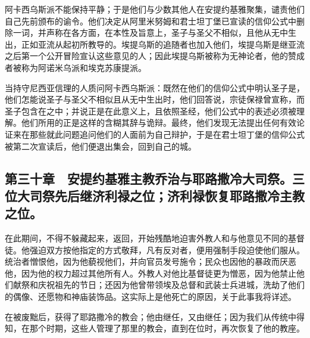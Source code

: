 阿卡西乌斯派不能保持平静；于是他们与少数其他人在安提约基雅聚集，谴责他们自己先前颁布的谕令。他们决定从阿里米努姆和君士坦丁堡已宣读的信仰公式中删除一词，并声称在各方面，在本性及旨意上，圣子与圣父不相似，且他从无中生出，正如亚流从起初所教导的。埃提乌斯的追随者也加入他们，埃提乌斯是继亚流之后第一个公开冒险宣认这些意见的人；因此埃提乌斯被称为无神论者，他的赞成者被称为阿诺米乌派和埃克苏康提派。\par

当持守尼西亚信理的人质问阿卡西乌斯派：既然在他们的信仰公式中明认圣子是，他们怎能说圣子与圣父不相似且从无中生出时，他们回答说，宗徒保禄曾宣称，而圣子包含在之中；并说正是在此意义上，且依照圣经，他们公式中的表述必须被理解。他们所用的正是这样的含糊其辞与诡辩。最终，他们发现无法提出任何有效论证来在那些就此问题追问他们的人面前为自己辩护，于是在君士坦丁堡的信仰公式被第二次宣读后，他们便退出集会，回到自己的城。\par


\subsection{第三十章　安提约基雅主教乔治与耶路撒冷大司祭。三位大司祭先后继济利禄之位；济利禄恢复耶路撒冷主教之位。}

在此期间，不得不躲藏起来，返回，开始残酷地迫害外教人和与他意见不同的基督徒。他强迫双方按他指定的方式敬拜，凡有反对者，便用强制手段迫使他们服从。统治者憎恨他，因为他藐视他们，并向官员发号施令；民众也因他的暴政而厌恶他，因为他的权力超过其他所有人。外教人对他比基督徒更为憎恶，因为他禁止他们献祭和庆祝祖先的节日；还因为他曾带领埃及总督和武装士兵进城，洗劫了他们的偶像、还愿物和神庙装饰品。这实际上是他死亡的原因，关于此事我将详述。\par

在被废黜后，获得了耶路撒冷的教会；他由继任，又由继任；因为我们从传统中得知，在那个时期，这些人管理了那里的教会，直到在位时，再次恢复了他的教座。\par


